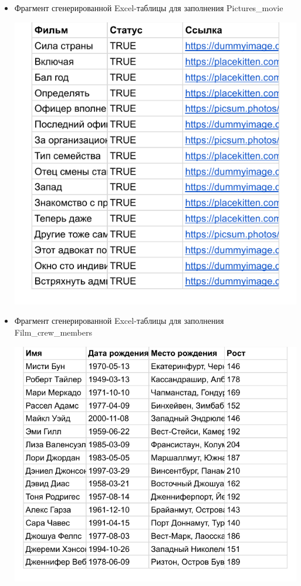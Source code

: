 \documentclass[a4paper,12pt]{article}
\renewcommand{\^}[2]{#1^{\, #2} \kern -1pt}
\newcommand{\1}{\kern 1pt}
\newcommand{\0}{\kern -1pt}
\begin{document}
\begin{itemize}
	\item Фрагмент сгенерированной Excel-таблицы для заполнения Pictures\_movie
	
	\includegraphics[scale=0.7,page=1]{table_inserts_excel/movie_pictures_random}
	

	\item Фрагмент сгенерированной Excel-таблицы для заполнения Film\_crew\_members
	
	
	\includegraphics[scale=0.7,page=1]{table_inserts_excel/members_random}
	


\end{itemize}
\end{document}
